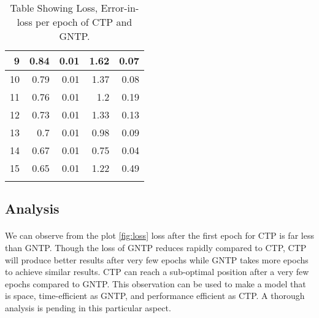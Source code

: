 \documentclass[Other]{iitddiss}
\begin{document}
\begin{longtable}[c]{|r|r|r|r|r|}
		9                                    & 0.84                                     & 0.01                                      & 1.62                                      & 0.07                                       \\ \hline
		10                                   & 0.79                                     & 0.01                                      & 1.37                                      & 0.08                                       \\ \hline
		11                                   & 0.76                                     & 0.01                                      & 1.2                                       & 0.19                                       \\ \hline
		12                                   & 0.73                                     & 0.01                                      & 1.33                                      & 0.13                                       \\ \hline
		13                                   & 0.7                                      & 0.01                                      & 0.98                                      & 0.09                                       \\ \hline
		14                                   & 0.67                                     & 0.01                                      & 0.75                                      & 0.04                                       \\ \hline
		15                                   & 0.65                                     & 0.01                                      & 1.22                                      & 0.49                                       \\ \hline
	\caption{Table Showing Loss, Error-in-loss per epoch of CTP and GNTP. }
	\label{tab:loss}
\end{longtable}

\subsection{Analysis}

\paragraph{}
We can observe from the plot \ref{fig:loss} loss after the first epoch for CTP is far less than GNTP. Though the loss of GNTP reduces rapidly compared to CTP, CTP will produce better results after very few epochs while GNTP takes more epochs to achieve similar results. CTP can reach a sub-optimal position after a very few epochs compared to GNTP. This observation can be used to make a model that is space, time-efficient as GNTP, and performance efficient as CTP. A thorough analysis is pending in this particular aspect.
\end{document}
